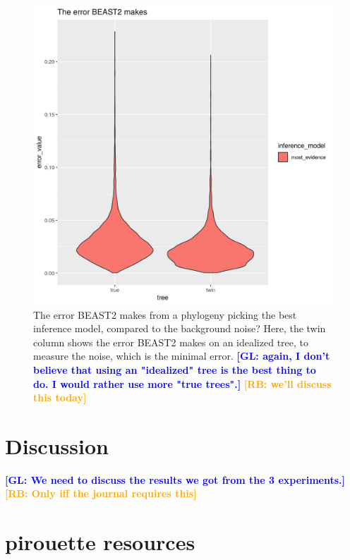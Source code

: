 \documentclass{article}
\newcommand{\giovanni}[1]{\textcolor{blue}{\textbf{[GL: #1]}}}
\newcommand{\richel}[1]{\textcolor{orange}{\textbf{[RB: #1]}}}
\begin{document}
\begin{figure}[h]
  \includegraphics[width=\textwidth]{figure_4.png}
  \caption{
    The error BEAST2 makes from a phylogeny 
    picking the best inference model, compared to the background noise?
    Here, the twin column shows the error BEAST2 makes on an idealized
    tree, to measure the noise, which is the minimal error. 
    \giovanni{again, I don't believe that using an "idealized" tree is the best 
      thing to do. I would rather use more "true trees".}
    \richel{we'll discuss this today}
  }
\end{figure}

\section{Discussion}

\giovanni{We need to discuss the results we got from the 3 experiments.}
\richel{Only iff the journal requires this}

\section{pirouette resources}
\end{document}
